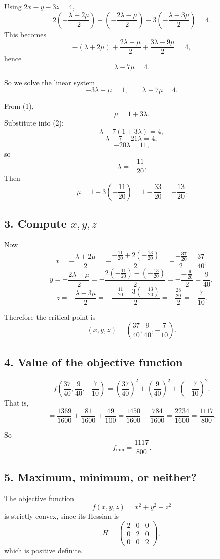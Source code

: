 Using \(2x-y-3z=4\),
\[
2\left(-\frac{\lambda+2\mu}{2}\right)
-\left(-\frac{2\lambda-\mu}{2}\right)
-3\left(-\frac{\lambda-3\mu}{2}\right)
=4.
\]
This becomes
\[
-(\lambda+2\mu)+\frac{2\lambda-\mu}{2}+\frac{3\lambda-9\mu}{2}=4,
\]
hence
\[
\lambda-7\mu=4. \tag{2}
\]

So we solve the linear system
\[
-3\lambda+\mu=1,
\qquad
\lambda-7\mu=4.
\]

From (1),
\[
\mu=1+3\lambda.
\]
Substitute into (2):
\[
\lambda-7(1+3\lambda)=4,
\]
\[
\lambda-7-21\lambda=4,
\]
\[
-20\lambda=11,
\]
so
\[
\lambda=-\frac{11}{20}.
\]
Then
\[
\mu=1+3\left(-\frac{11}{20}\right)
=1-\frac{33}{20}
=-\frac{13}{20}.
\]

\subsection*{3. Compute \(x,y,z\)}

Now
\[
x=-\frac{\lambda+2\mu}{2}
=
-\frac{-\frac{11}{20}+2\left(-\frac{13}{20}\right)}{2}
=
-\frac{-\frac{37}{20}}{2}
=
\frac{37}{40},
\]
\[
y=-\frac{2\lambda-\mu}{2}
=
-\frac{2\left(-\frac{11}{20}\right)-\left(-\frac{13}{20}\right)}{2}
=
-\frac{-\frac{9}{20}}{2}
=
\frac{9}{40},
\]
\[
z=-\frac{\lambda-3\mu}{2}
=
-\frac{-\frac{11}{20}-3\left(-\frac{13}{20}\right)}{2}
=
-\frac{\frac{28}{20}}{2}
=
-\frac{7}{10}.
\]

Therefore the critical point is
\[
\boxed{
\left(x,y,z\right)=\left(\frac{37}{40},\frac{9}{40},-\frac{7}{10}\right).
}
\]

\subsection*{4. Value of the objective function}

\[
f\left(\frac{37}{40},\frac{9}{40},-\frac{7}{10}\right)
=
\left(\frac{37}{40}\right)^2
+
\left(\frac{9}{40}\right)^2
+
\left(-\frac{7}{10}\right)^2.
\]
That is,
\[
=
\frac{1369}{1600}
+
\frac{81}{1600}
+
\frac{49}{100}
=
\frac{1450}{1600}+\frac{784}{1600}
=
\frac{2234}{1600}
=
\frac{1117}{800}.
\]

So
\[
\boxed{
f_{\min}=\frac{1117}{800}.
}
\]

\subsection*{5. Maximum, minimum, or neither?}

The objective function
\[
f(x,y,z)=x^2+y^2+z^2
\]
is strictly convex, since its Hessian is
\[
H=
\begin{pmatrix}
2 & 0 & 0\\
0 & 2 & 0\\
0 & 0 & 2
\end{pmatrix},
\]
which is positive definite.

